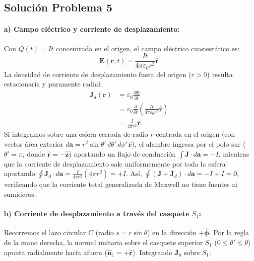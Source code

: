 \documentclass[11pt]{article}
\begin{document}
\subsection*{Solución Problema 5}

\paragraph{a) Campo eléctrico y corriente de desplazamiento:}
Con $Q(t) = I t$ concentrada en el origen, el campo eléctrico cuasiestático es:
\begin{equation}
    \mathbf{E}(\mathbf{r}, t) = \frac{I t}{4\pi\varepsilon_0 r^2} \hat{\mathbf{r}}
\end{equation}
La densidad de corriente de desplazamiento fuera del origen ($r > 0$) resulta estacionaria y puramente radial:
\begin{align*}
    \mathbf J_d(\mathbf r)
    &=\varepsilon_0\frac{\partial\mathbf E}{\partial t}\\
    &=\varepsilon_0\frac{\partial}{\partial t}
      \left(\frac{It}{4\pi\varepsilon_0r^2}\hat{\mathbf r}\right)\\
    &=\frac{I}{4\pi r^2}\hat{\mathbf r}.
\end{align*}
Si integramos sobre una esfera cerrada de radio $r$ centrada en el origen (con vector área exterior $d\mathbf{a} = r^2 \sin\theta'\, d\theta'\, d\phi'\, \hat{\mathbf{r}}$), el alambre ingresa por el polo sur ($\theta' = \pi$, donde $\hat{\mathbf{r}} = -\hat{\mathbf{z}}$) aportando un flujo de conducción $\int \mathbf{J} \cdot d\mathbf{a} = -I$, mientras que la corriente de desplazamiento sale uniformemente por toda la esfera aportando $\oint \mathbf{J}_d \cdot d\mathbf{a} = \frac{I}{4\pi r^2}(4\pi r^2) = +I$. Así, $\oint (\mathbf{J} + \mathbf{J}_d) \cdot d\mathbf{a} = -I + I = 0$, verificando que la corriente total generalizada de Maxwell no tiene fuentes ni sumideros.

\paragraph{b) Corriente de desplazamiento a través del casquete $S_1$:}
Recorremos el lazo circular $C$ (radio $s = r\sin\theta$) en la dirección $+\hat{\boldsymbol{\phi}}$. Por la regla de la mano derecha, la normal unitaria sobre el casquete superior $S_1$ ($0 \le \theta' \le \theta$) apunta radialmente hacia afuera ($\hat{\mathbf{n}}_1 = +\hat{\mathbf{r}}$). Integrando $\mathbf{J}_d$ sobre $S_1$:
\end{document}
